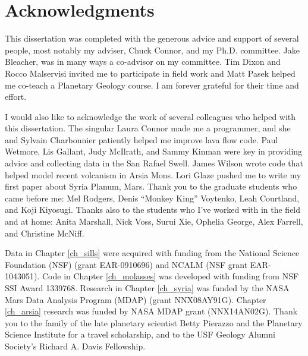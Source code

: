 \chapter*{Acknowledgments}
This dissertation was completed with the generous advice and support of several people, most notably my adviser, Chuck Connor, and my Ph.D. committee. Jake Bleacher, was in many ways a co-advisor on my committee. Tim Dixon and Rocco Malservisi invited me to participate in field work and Matt Pasek helped me co-teach a Planetary Geology course. I am forever grateful for their time and effort.

I would also like to acknowledge the work of several colleagues who helped with this dissertation. The singular Laura Connor made me a programmer, and she and Sylvain Charbonnier patiently helped me improve lava flow code. Paul Wetmore, Lis Gallant, Judy McIlrath, and Sammy Kinman were key in providing advice and collecting data in the San Rafael Swell. James Wilson wrote code that helped model recent volcanism in Arsia Mons. Lori Glaze pushed me to write my first paper about Syria Planum, Mars. Thank you to the graduate students who came before me: Mel Rodgers, Denis ``Monkey King'' Voytenko, Leah Courtland, and Koji Kiyosugi. Thanks also to the students who I've worked with in the field and at home: Anita Marshall, Nick Voss, Surui Xie, Ophelia George, Alex Farrell, and Christine McNiff.

Data in Chapter \ref{ch_sills} were acquired with funding from the National Science Foundation (NSF) (grant EAR-0910696) and NCALM (NSF grant EAR-1043051). Code in Chapter \ref{ch_molasses} was developed with funding from NSF SSI Award 1339768. Research in Chapter \ref{ch_syria} was funded by the NASA Mars Data Analysis Program (MDAP) (grant NNX08AY91G). Chapter \ref{ch_arsia} research was funded by NASA MDAP grant (NNX14AN02G). Thank you to the family of the late planetary scientist Betty Pierazzo and the Planetary Science Institute for a travel scholarship, and to the USF Geology Alumni Society's Richard A. Davis Fellowship.

